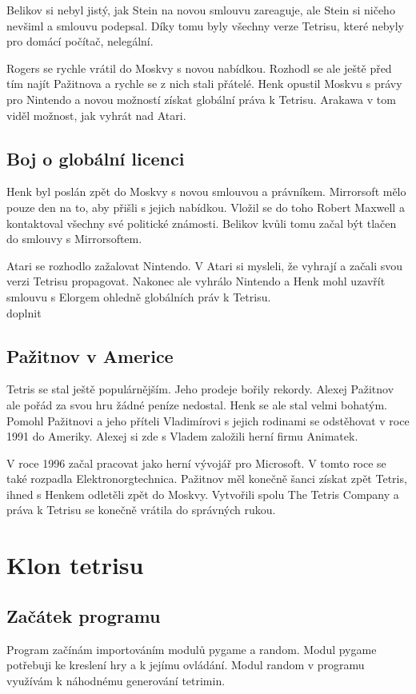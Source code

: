 \documentclass[12pt]{report}			%
\begin{document}
Belikov si nebyl jistý, jak Stein na novou smlouvu zareaguje, ale Stein si ničeho nevšiml a smlouvu podepsal. Díky tomu byly všechny verze Tetrisu, které nebyly pro domácí počítač, nelegální.\cite{Brown2016}

Rogers se rychle vrátil do Moskvy s novou nabídkou. Rozhodl se ale ještě před tím najít Pažitnova a rychle se z nich stali přátelé. Henk opustil Moskvu s právy pro Nintendo a novou možností získat globální práva k Tetrisu. Arakawa v tom viděl možnost, jak vyhrát nad Atari.\cite{Brown2016}\\

\chapter{Boj o globální licenci}
Henk byl poslán zpět do Moskvy s novou smlouvou a právníkem. Mirrorsoft mělo pouze den na to, aby přišli s jejich nabídkou. Vložil se do toho Robert Maxwell a kontaktoval všechny své politické známosti. Belikov kvůli tomu začal být tlačen do smlouvy s Mirrorsoftem.\cite{Brown2016}

Atari se rozhodlo zažalovat Nintendo. V Atari si mysleli, že vyhrají a začali svou verzi Tetrisu propagovat. Nakonec ale vyhrálo Nintendo a Henk mohl uzavřít smlouvu s Elorgem ohledně globálních práv k Tetrisu.\cite{Brown2016}\\

doplnit
\chapter{Pažitnov v Americe}
Tetris se stal ještě populárnějším. Jeho prodeje bořily rekordy. Alexej Pažitnov ale pořád za svou hru žádné peníze nedostal. Henk se ale stal velmi bohatým. Pomohl Pažitnovi a jeho příteli Vladimírovi s jejich rodinami se odstěhovat v roce 1991 do Ameriky. Alexej si zde s Vladem založili herní firmu Animatek.\cite{Brown2016}

V roce 1996 začal pracovat jako herní vývojář pro Microsoft. V tomto roce se také rozpadla Elektronorgtechnica. Pažitnov měl konečně šanci získat zpět Tetris, ihned s Henkem odletěli zpět do Moskvy. Vytvořili spolu The Tetris Company a práva k Tetrisu se konečně vrátila do správných rukou.\cite{Brown2016}\\
				
	\part{Klon tetrisu}
		\chapter{Začátek programu}
Program začínám importováním modulů pygame a random. Modul pygame potřebuji ke kreslení hry a k jejímu ovládání. Modul random v programu využívám k náhodnému generování tetrimin.
\end{document}
